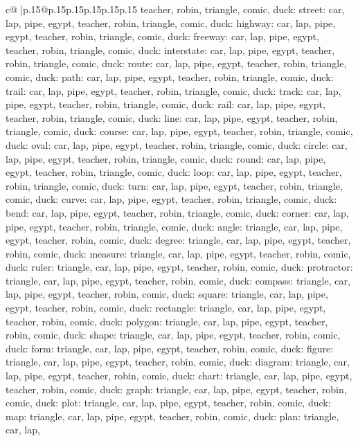\documentclass{article}
\begin{document}
{\begin{supertabular}{c@{$\;$}|p{.15\linewidth}@{}p{.15\linewidth}p{.15\linewidth}p{.15\linewidth}p{.15\linewidth}p{.15\linewidth}}
{{{teacher, robin, triangle, comic, duck\n\nCLUE: street\nTARGETS: car, lap, pipe, egypt, teacher, robin, triangle, comic, duck\n\nCLUE: highway\nTARGETS: car, lap, pipe, egypt, teacher, robin, triangle, comic, duck\n\nCLUE: freeway\nTARGETS: car, lap, pipe, egypt, teacher, robin, triangle, comic, duck\n\nCLUE: interstate\nTARGETS: car, lap, pipe, egypt, teacher, robin, triangle, comic, duck\n\nCLUE: route\nTARGETS: car, lap, pipe, egypt, teacher, robin, triangle, comic, duck\n\nCLUE: path\nTARGETS: car, lap, pipe, egypt, teacher, robin, triangle, comic, duck\n\nCLUE: trail\nTARGETS: car, lap, pipe, egypt, teacher, robin, triangle, comic, duck\n\nCLUE: track\nTARGETS: car, lap, pipe, egypt, teacher, robin, triangle, comic, duck\n\nCLUE: rail\nTARGETS: car, lap, pipe, egypt, teacher, robin, triangle, comic, duck\n\nCLUE: line\nTARGETS: car, lap, pipe, egypt, teacher, robin, triangle, comic, duck\n\nCLUE: course\nTARGETS: car, lap, pipe, egypt, teacher, robin, triangle, comic, duck\n\nCLUE: oval\nTARGETS: car, lap, pipe, egypt, teacher, robin, triangle, comic, duck\n\nCLUE: circle\nTARGETS: car, lap, pipe, egypt, teacher, robin, triangle, comic, duck\n\nCLUE: round\nTARGETS: car, lap, pipe, egypt, teacher, robin, triangle, comic, duck\n\nCLUE: loop\nTARGETS: car, lap, pipe, egypt, teacher, robin, triangle, comic, duck\n\nCLUE: turn\nTARGETS: car, lap, pipe, egypt, teacher, robin, triangle, comic, duck\n\nCLUE: curve\nTARGETS: car, lap, pipe, egypt, teacher, robin, triangle, comic, duck\n\nCLUE: bend\nTARGETS: car, lap, pipe, egypt, teacher, robin, triangle, comic, duck\n\nCLUE: corner\nTARGETS: car, lap, pipe, egypt, teacher, robin, triangle, comic, duck\n\nCLUE: angle\nTARGETS: triangle, car, lap, pipe, egypt, teacher, robin, comic, duck\n\nCLUE: degree\nTARGETS: triangle, car, lap, pipe, egypt, teacher, robin, comic, duck\n\nCLUE: measure\nTARGETS: triangle, car, lap, pipe, egypt, teacher, robin, comic, duck\n\nCLUE: ruler\nTARGETS: triangle, car, lap, pipe, egypt, teacher, robin, comic, duck\n\nCLUE: protractor\nTARGETS: triangle, car, lap, pipe, egypt, teacher, robin, comic, duck\n\nCLUE: compass\nTARGETS: triangle, car, lap, pipe, egypt, teacher, robin, comic, duck\n\nCLUE: square\nTARGETS: triangle, car, lap, pipe, egypt, teacher, robin, comic, duck\n\nCLUE: rectangle\nTARGETS: triangle, car, lap, pipe, egypt, teacher, robin, comic, duck\n\nCLUE: polygon\nTARGETS: triangle, car, lap, pipe, egypt, teacher, robin, comic, duck\n\nCLUE: shape\nTARGETS: triangle, car, lap, pipe, egypt, teacher, robin, comic, duck\n\nCLUE: form\nTARGETS: triangle, car, lap, pipe, egypt, teacher, robin, comic, duck\n\nCLUE: figure\nTARGETS: triangle, car, lap, pipe, egypt, teacher, robin, comic, duck\n\nCLUE: diagram\nTARGETS: triangle, car, lap, pipe, egypt, teacher, robin, comic, duck\n\nCLUE: chart\nTARGETS: triangle, car, lap, pipe, egypt, teacher, robin, comic, duck\n\nCLUE: graph\nTARGETS: triangle, car, lap, pipe, egypt, teacher, robin, comic, duck\n\nCLUE: plot\nTARGETS: triangle, car, lap, pipe, egypt, teacher, robin, comic, duck\n\nCLUE: map\nTARGETS: triangle, car, lap, pipe, egypt, teacher, robin, comic, duck\n\nCLUE: plan\nTARGETS: triangle, car, lap, }}}
\end{supertabular}}
\end{document}
